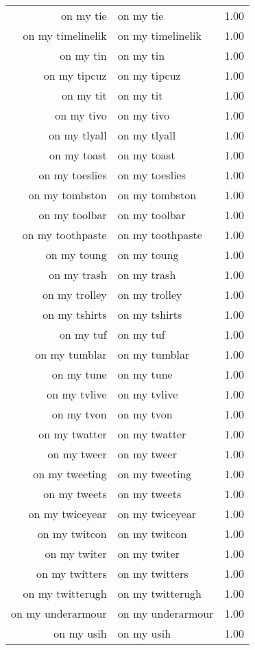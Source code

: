 \begin{table}[ht]
\begin{tabular}{rlr}
  on my tie & on my tie & 1.00 \\ 
  on my timelinelik & on my timelinelik & 1.00 \\ 
  on my tin & on my tin & 1.00 \\ 
  on my tipcuz & on my tipcuz & 1.00 \\ 
  on my tit & on my tit & 1.00 \\ 
  on my tivo & on my tivo & 1.00 \\ 
  on my tlyall & on my tlyall & 1.00 \\ 
  on my toast & on my toast & 1.00 \\ 
  on my toeslies & on my toeslies & 1.00 \\ 
  on my tombston & on my tombston & 1.00 \\ 
  on my toolbar & on my toolbar & 1.00 \\ 
  on my toothpaste & on my toothpaste & 1.00 \\ 
  on my toung & on my toung & 1.00 \\ 
  on my trash & on my trash & 1.00 \\ 
  on my trolley & on my trolley & 1.00 \\ 
  on my tshirts & on my tshirts & 1.00 \\ 
  on my tuf & on my tuf & 1.00 \\ 
  on my tumblar & on my tumblar & 1.00 \\ 
  on my tune & on my tune & 1.00 \\ 
  on my tvlive & on my tvlive & 1.00 \\ 
  on my tvon & on my tvon & 1.00 \\ 
  on my twatter & on my twatter & 1.00 \\ 
  on my tweer & on my tweer & 1.00 \\ 
  on my tweeting & on my tweeting & 1.00 \\ 
  on my tweets & on my tweets & 1.00 \\ 
  on my twiceyear & on my twiceyear & 1.00 \\ 
  on my twitcon & on my twitcon & 1.00 \\ 
  on my twiter & on my twiter & 1.00 \\ 
  on my twitters & on my twitters & 1.00 \\ 
  on my twitterugh & on my twitterugh & 1.00 \\ 
  on my underarmour & on my underarmour & 1.00 \\ 
  on my usih & on my usih & 1.00 \\ 

\end{tabular}
\end{table}
